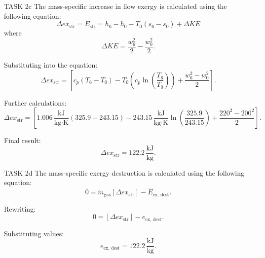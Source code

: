 TASK 2c  
The mass-specific increase in flow exergy is calculated using the following equation:  
\[
\Delta ex_{\text{str}} = E_{\text{str}} = h_6 - h_0 - T_0 (s_6 - s_0) + \Delta KE
\]  
where  
\[
\Delta KE = \frac{w_6^2}{2} - \frac{w_0^2}{2}.
\]  

Substituting into the equation:  
\[
\Delta ex_{\text{str}} = \left[ c_p (T_6 - T_0) - T_0 \left( c_p \ln \left( \frac{T_6}{T_0} \right) \right) + \frac{w_6^2 - w_0^2}{2} \right].
\]  

Further calculations:  
\[
\Delta ex_{\text{str}} = \left[ 1.006 \, \frac{\text{kJ}}{\text{kg·K}} (325.9 - 243.15) - 243.15 \, \frac{\text{kJ}}{\text{kg·K}} \ln \left( \frac{325.9}{243.15} \right) + \frac{220^2 - 200^2}{2} \right].
\]  

Final result:  
\[
\Delta ex_{\text{str}} = 122.2 \, \frac{\text{kJ}}{\text{kg}}.
\]  

TASK 2d  
The mass-specific exergy destruction is calculated using the following equation:  
\[
0 = \dot{m}_{\text{gas}} \left[ \Delta ex_{\text{str}} \right] - \dot{E}_{\text{ex, dest}}.
\]  

Rewriting:  
\[
0 = \left[ \Delta ex_{\text{str}} \right] - e_{\text{ex, dest}}.
\]  

Substituting values:  
\[
e_{\text{ex, dest}} = 122.2 \, \frac{\text{kJ}}{\text{kg}}.
\]